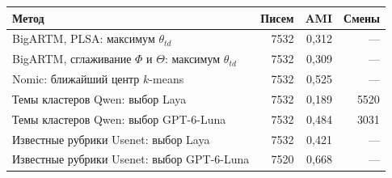 \begin{tabular}{lrrr}\toprule
Метод & Писем & AMI & Смены\\\midrule
BigARTM, PLSA: максимум $\theta_{td}$ & 7532 & 0,312 & ---\\
BigARTM, сглаживание $\Phi$ и $\Theta$: максимум $\theta_{td}$ & 7532 & 0,309 & ---\\
Nomic: ближайший центр $k$-means & 7532 & 0,525 & ---\\
Темы кластеров Qwen: выбор Laya & 7532 & 0,189 & 5520\\
Темы кластеров Qwen: выбор GPT-6-Luna & 7532 & 0,484 & 3031\\
\midrule
Известные рубрики Usenet: выбор Laya & 7532 & 0,421 & ---\\
Известные рубрики Usenet: выбор GPT-6-Luna & 7520 & 0,668 & ---\\
\bottomrule\end{tabular}
